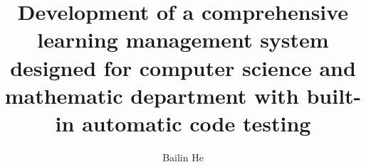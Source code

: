 

\title{Development of a comprehensive learning management system designed for
computer science and mathematic department with built-in automatic
code testing}

\author{Bailin He}







\firstThreePages


\Acknowledgments



\tocAndSuch


